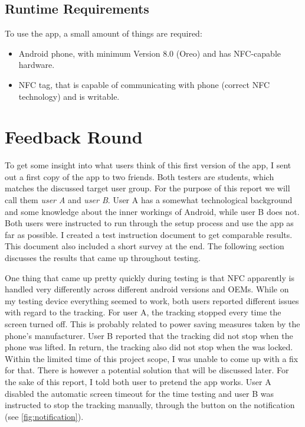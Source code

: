\documentclass[conference]{IEEEtran}
\begin{document}
\subsection{Runtime Requirements}
To use the app, a small amount of things are required:

\begin{itemize}
	\item Android phone, with minimum Version 8.0 (Oreo) and has NFC-capable hardware.
	\item NFC tag, that is capable of communicating with phone (correct NFC technology) and is writable.
\end{itemize}

\section{Feedback Round}
To get some insight into what users think of this first version of the app, I sent out a first copy of the app to two friends. Both testers are students, which matches the discussed target user group. For the purpose of this report we will call them \textit{user A} and \textit{user B}. User A has a somewhat technological background and some knowledge about the inner workings of Android, while user B does not.
Both users were instructed to run through the setup process and use the app as far as possible. I created a test instruction document to get comparable results. This document also included a short survey at the end. The following section discusses the results that came up throughout testing.

One thing that came up pretty quickly during testing is that NFC apparently is handled very differently across different android versions and OEMs. While on my testing device everything seemed to work, both users reported different issues with regard to the tracking. For user A, the tracking stopped every time the screen turned off. This is probably related to power saving measures taken by the phone's manufacturer. User B reported that the tracking did not stop when the phone was lifted. In return, the tracking also did not stop when the was locked. Within the limited time of this project scope, I was unable to come up with a fix for that. There is however a potential solution that will be discussed later. For the sake of this report, I told both user to pretend the app works. User A disabled the automatic screen timeout for the time testing and user B was instructed to stop the tracking manually, through the button on the notification (see \cref{fig:notification}).
\end{document}
